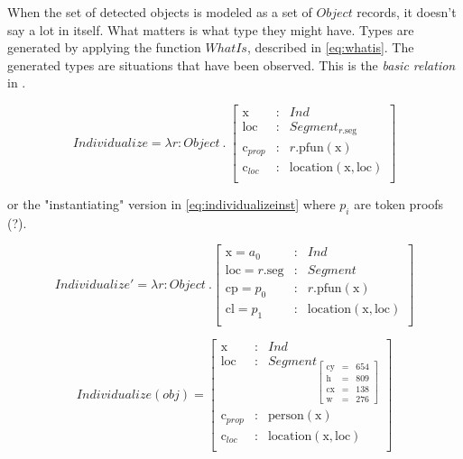 \documentclass[11pt, a4paper]{article}
\begin{document}
When the set of detected objects is modeled as a set of $Object$ records, it doesn't say a lot in itself.
What matters is what type they might have.
Types are generated by applying the function $WhatIs$, described in \autoref{eq:whatis}.
The generated types are situations that have been observed.
This is the \textit{basic relation} in \cite{LoganComputationalAnalysisApprehension1996}.


\begin{equation}\label{eq:whatis}
Individualize = \lambda r:Object\ .\ \left[\begin{array}{rcl}
\text{x} &:& Ind\\
\text{loc} &:& Segment_{r.\text{seg}}\\
\text{c}_{prop} &:& r.\text{pfun}(\text{x})\\
\text{c}_{loc} &:& \text{location}(\text{x}, \text{loc})\\
\end{array}\right]\end{equation}

or the "instantiating" version in \autoref{eq:individualizeinst} where $p_i$ are token proofs (?).

\begin{equation}\label{eq:individualizeinst}
Individualize' = \lambda r : Object\ . \left[\begin{array}{lcl}
    \text{x} = a_0 &:& Ind \\
    \text{loc} = r.\text{seg} &:& Segment\\
    \text{cp} = p_0 &:& r.\text{pfun}(\text{x}) \\
    \text{cl} = p_1 &:& \text{location}(\text{x}, \text{loc}) \\
\end{array}\right]
\end{equation}

\begin{equation}\label{eq:ind1}
Individualize(obj) = 
\left[\begin{array}{rcl}
\text{x} &:& Ind\\
\text{loc} &:& Segment_{\left[\begin{array}{rcl}
	\text{cy} &=& 654\\
	\text{h} &=& 809\\
	\text{cx} &=& 138\\
	\text{w} &=& 276
	\end{array}\right]}\\
\text{c}_{prop} &:& \text{person}(\text{x})\\
\text{c}_{loc} &:& \text{location}(\text{x}, \text{loc})\\
\end{array}\right]
\end{equation}
\end{document}
